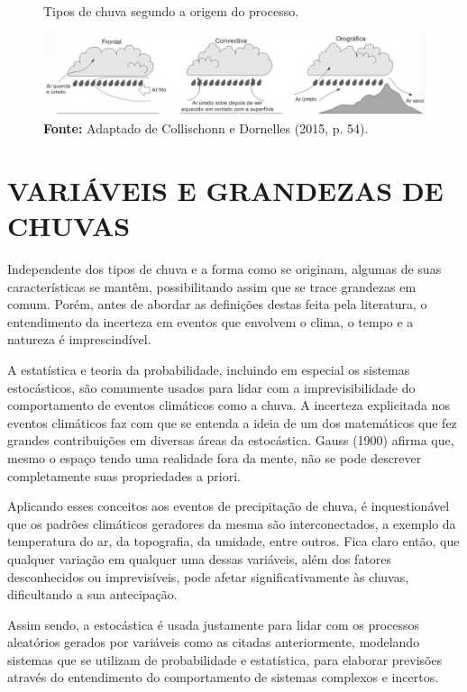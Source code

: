 \begin{figure}[!ht]
	\centering
	\caption{Tipos de chuva segundo a origem do processo.}
	\includegraphics[width=.9\linewidth]{figuras/tipos_de_chuva_segundo_a_origem_do_processo.png}
	\caption*{\textbf{Fonte:} Adaptado de Collischonn e Dornelles (2015, p. 54).}
	\label{fig:tipos_de_chuva_segundo_a_origem_do_processo.png}
\end{figure}

\section{VARIÁVEIS E GRANDEZAS DE CHUVAS}

Independente dos tipos de chuva e a forma como se originam, algumas de suas características se mantêm, possibilitando assim que se trace grandezas em comum. Porém, antes de abordar as definições destas feita pela literatura, o entendimento da incerteza em eventos que envolvem o clima, o tempo e a natureza é imprescindível.

A estatística e teoria da probabilidade, incluindo em especial os sistemas estocásticos, são comumente usados para lidar com a imprevisibilidade do comportamento de eventos climáticos como a chuva. A incerteza explicitada nos eventos climáticos faz com que se entenda a ideia de um dos matemáticos que fez grandes contribuições em diversas áreas da estocástica. Gauss (1900) afirma que, mesmo o espaço tendo uma realidade fora da mente, não se pode descrever completamente suas propriedades a priori.

Aplicando esses conceitos aos eventos de precipitação de chuva, é inquestionável que os padrões climáticos geradores da mesma são interconectados, a exemplo da temperatura do ar, da topografia, da umidade, entre outros. Fica claro então, que qualquer variação em qualquer uma dessas variáveis, além dos fatores desconhecidos ou imprevisíveis, pode afetar significativamente às chuvas, dificultando a sua antecipação. 

Assim sendo, a estocástica é usada justamente para lidar com os processos aleatórios gerados por variáveis como as citadas anteriormente, modelando sistemas que se utilizam de probabilidade e estatística, para elaborar previsões através do entendimento do comportamento de sistemas complexos e incertos.

